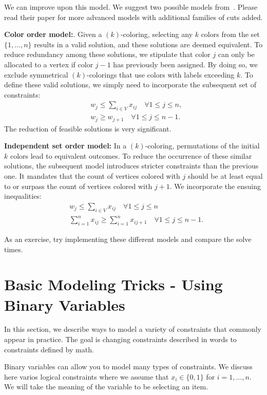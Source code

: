 We can improve upon this model.  We suggest two possible models from~\cite{MENDEZDIAZ2008159}.  Please read their paper for more advanced models with additional families of cuts added.

\textbf{ Color order model:}. 
Given a $(k)$-coloring, selecting any $k$ colors from the set $\{1, \ldots, n\}$ results in a valid solution, and these solutions are deemed equivalent. To reduce redundancy among these solutions, we stipulate that color $j$ can only be allocated to a vertex if color $j-1$ has previously been assigned. By doing so, we exclude symmetrical $(k)$-colorings that use colors with labels exceeding $k$. To define these valid solutions, we simply need to incorporate the subsequent set of constraints:
$$
\begin{aligned}
& w_j \leqslant \sum_{i \in V} x_{i j} \quad \forall 1 \leqslant j \leqslant n, \\
& w_j \geqslant w_{j+1} \quad \forall 1 \leqslant j \leqslant n-1 .
\end{aligned}
$$
The reduction of feasible solutions is very significant.

\textbf{ Independent set order model:} 
In a $(k)$-coloring, permutations of the initial $k$ colors lead to equivalent outcomes. To reduce the occurrence of these similar solutions, the subsequent model introduces stricter constraints than the previous one. It mandates that the count of vertices colored with $j$ should be at least equal to or surpass the count of vertices colored with $j+1$. We incorporate the ensuing inequalities:
$$
\begin{aligned}
& w_j \leqslant \sum_{i \in V} x_{i j} \quad \forall 1 \leqslant j \leqslant n \\
& \sum_{i=1}^n x_{i j} \geqslant \sum_{i=1}^n x_{i j+1} \quad \forall 1 \leqslant j \leqslant n-1 .
\end{aligned}
$$

As an exercise, try implementing these different models and compare the solve times.

\newpage
\section{Basic Modeling Tricks - Using Binary Variables}

In this section, we describe ways to model a variety of constraints that commonly appear in practice.  The goal is changing constraints described in words to constraints defined by math.

Binary variables can allow you to model many types of constraints.  We discuss here varios logical constraints where we assume that $x_i \in \{0,1\}$ for $i=1, \dots, n$.  We will take the meaning of the variable to be selecting an item.

